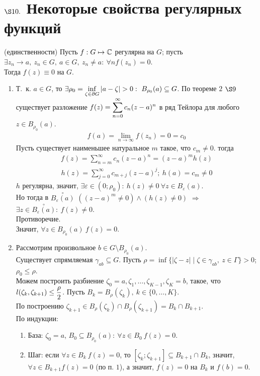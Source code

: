 \section{$\S 10.$ Некоторые свойства регулярных функций}
\theorem (единственности)
Пусть $f: G \mapsto \mathbb{C}$ регулярна на $G$; пусть $\exists z_n \to a, \ z_n \in
G, \ a \in G, \ z_n \neq a: \ \forall n f(z_n) = 0$.
\\
Тогда $f(z) \equiv 0$ на $G$.
\pr
\begin{enumerate}
    \item Т.~к. $a \in G$, то $\exists \rho_0 = \displaystyle \inf_{\zeta \in \partial
      G}\left| a-\zeta \right| > 0: \ B_{\rho_0}(a) \subseteq G $. По теореме
    $2$ $\S 9$ существует разложение $f(z) = \displaystyle \sum_{n=0}^{\infty}c_n(z-a)^n$
    в ряд Тейлора для любого $z \in B_{\rho_0}(a)$.
    \begin{align*}
      f(a) = \lim_{n \to \infty} f(z_n) = 0 = c_0
    \end{align*}
    Пусть существует наименьшее натуральное $m$ такое, что $c_m \neq 0$. тогда
    \begin{align*}
      f(z) = \sum_{n=m}^{\infty}c_n(z-a)^n = (z-a)^mh(z)
    \end{align*}
    \begin{align*}
      h(z) = \sum_{j=0}^{\infty}c_{m+j}(z-a)^j; \ h(a) = c_m \neq 0
    \end{align*}
    $h$ регулярна, значит, $\exists \varepsilon \in (0; \rho_0): \ h(z) \neq 0
    \ \forall z \in B_{\varepsilon}(a)$.
    \\
    Но тогда в $\overset{\circ}{B_{\varepsilon}(a)}$ $((z-a)^m \neq 0) \wedge
    (h(z) \neq 0)$ $\Rightarrow$ $\exists z \in
    \overset{\circ}{B_{\varepsilon}(a)}: \ f(z) \neq 0$.
    \\
    Противоречие.
    \\
    Значит, $\forall z \in B_{\rho_0}(a) \ f(z) = 0$.
    \item Рассмотрим произвольное $b \in G \setminus B_{\rho_0}(a)$.
    \\
    Существует спрямляемая $\gamma_{ab} \subseteq G$. Пусть $\rho = \inf\{\left|
        \zeta - z \right| \mid \zeta \in \gamma_{ab}, \ z \in \Gamma\} > 0$;
    $\rho_0 \leq \rho$.
    \\
    Можем построить разбиение $\zeta_0 = a, \zeta_1, \dots, \zeta_{K-1}, \zeta_K
    = b$, такое, что $l(\zeta_k, \zeta_{k+1}) \leq \displaystyle \frac{\rho}{2}$. Пусть
    $B_k = B_{\rho}(\zeta_k), \ k \in \{0, \dots, K\}$.
    \\
    По построению $\zeta_{k+1}\in B_{\rho}(\zeta_k) \cap B_{\rho}(\zeta_{k+1}) =
    B_k \cap B_{k+1}$.
    \\
    По индукции:
    \begin{enumerate}
        \item База: $\zeta_0 = a$, $B_0 \subseteq B_{\rho_0}(a): \ \forall z \in
        B_0 \ f(z) = 0$.
        \item Шаг: если $\forall z \in B_k \ f(z) = 0$, то $[\zeta_k;
        \zeta_{k+1}]\subseteq B_{k+1}\cap B_{k}$, значит, $\forall z \in B_{k+1}
        f(z) = 0$ (по п. $1$), а значит, $f(z) = 0$ на $B_k$ и $f(b) = 0 $.
    \end{enumerate}
\end{enumerate}
